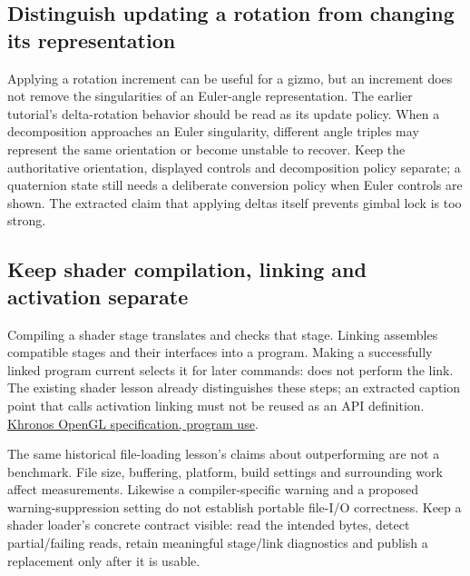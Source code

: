 \subsection{Distinguish updating a rotation from changing its representation}\label{06-engine-ii-ch046-distinguish-updating-a-rotation-from-changing-its-representation}

\hypertarget{06-engine-ii-ch046-distinguish-updating-a-rotation-from-changing-its-representation}{}

Applying a rotation increment can be useful for a gizmo, but an increment does not remove the singularities of an Euler-angle representation. The earlier tutorial's delta-rotation behavior should be read as its update policy. When a decomposition approaches an Euler singularity, different angle triples may represent the same orientation or become unstable to recover. Keep the authoritative orientation, displayed controls and decomposition policy separate; a quaternion state still needs a deliberate conversion policy when Euler controls are shown. The extracted claim that applying deltas itself prevents gimbal lock is too strong.

\subsection{Keep shader compilation, linking and activation separate}\label{06-engine-ii-ch046-keep-shader-compilation-linking-and-activation-separate}

\hypertarget{06-engine-ii-ch046-keep-shader-compilation-linking-and-activation-separate}{}

Compiling a shader stage translates and checks that stage. Linking assembles compatible stages and their interfaces into a program. Making a successfully linked program current selects it for later commands:  does not perform the link. The existing shader lesson already distinguishes these steps; an extracted caption point that calls activation linking must not be reused as an API definition. \href{https://registry.khronos.org/OpenGL/specs/gl/glspec46.compatibility.pdf}{Khronos OpenGL specification, program use}.

The same historical file-loading lesson's claims about  outperforming  are not a benchmark. File size, buffering, platform, build settings and surrounding work affect measurements. Likewise a compiler-specific warning and a proposed warning-suppression setting do not establish portable file-I/O correctness. Keep a shader loader's concrete contract visible: read the intended bytes, detect partial/failing reads, retain meaningful stage/link diagnostics and publish a replacement only after it is usable.

